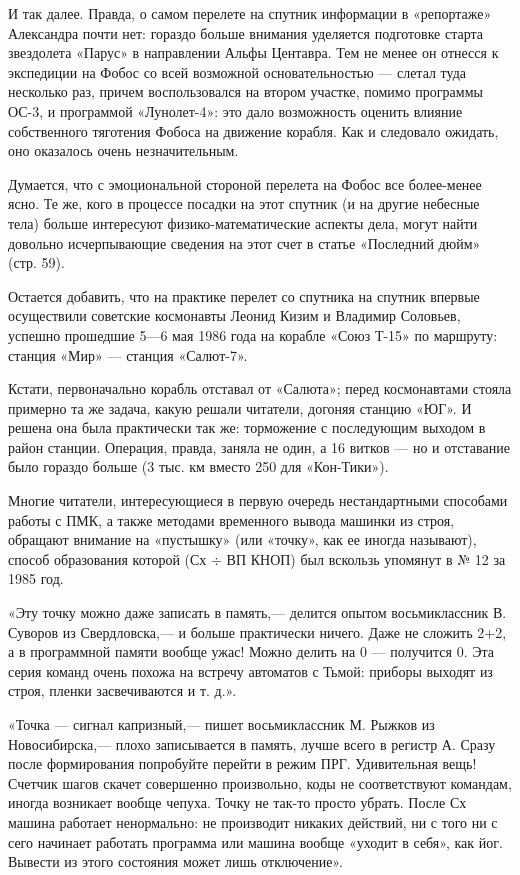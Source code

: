 \documentclass[11pt,a4paper,oneside]{article}
\begin{document}
И так далее. Правда, о самом перелете на спутник информации в «репортаже» Александра почти нет: гораздо больше внимания уделяется подготовке старта звездолета «Парус» в направлении Альфы Центавра. Тем не менее он отнесся к экспедиции на Фобос со всей возможной основательностью — слетал туда несколько раз, причем воспользовался на втором участке, помимо программы ОС-3, и программой «Лунолет-4»: это дало возможность оценить влияние собственного тяготения Фобоса на движение корабля. Как и следовало ожидать, оно оказалось очень незначительным.

Думается, что с эмоциональной стороной перелета на Фобос все более-менее ясно. Те же, кого в процессе посадки на этот спутник (и на другие небесные тела) больше интересуют физико-математические аспекты дела, могут найти довольно исчерпывающие сведения на этот счет в статье «Последний дюйм» (стр. 59).

Остается добавить, что на практике перелет со спутника на спутник впервые осуществили советские космонавты Леонид Кизим и Владимир Соловьев, успешно прошедшие 5—6 мая 1986 года на корабле «Союз Т-15» по маршруту: станция «Мир» — станция «Салют-7».

Кстати, первоначально корабль отставал от «Салюта»; перед космонавтами стояла примерно та же задача, какую решали читатели, догоняя станцию «ЮГ». И решена она была практически так же: торможение с последующим выходом в район станции. Операция, правда, заняла не один, а 16 витков — но и отставание было гораздо больше (3 тыс. км вместо 250 для «Кон-Тики»).

Многие читатели, интересующиеся в первую очередь нестандартными способами работы с ПМК, а также методами временного вывода машинки из строя, обращают внимание на «пустышку» (или «точку», как ее иногда называют), способ образования которой (Сх $\div$ ВП КНОП) был вскользь упомянут в № 12 за 1985 год.

«Эту точку можно даже записать в память,— делится опытом восьмиклассник В. Суворов из Свердловска,— и больше практически ничего. Даже не сложить 2+2, а в программной памяти вообще ужас! Можно делить на 0 — получится 0. Эта серия команд очень похожа на встречу автоматов с Тьмой: приборы выходят из строя, пленки засвечиваются и т. д.».

«Точка — сигнал капризный,— пишет восьмиклассник М. Рыжков из Новосибирска,— плохо записывается в память, лучше всего в регистр А. Сразу после формирования попробуйте перейти в режим ПРГ. Удивительная вещь! Счетчик шагов скачет совершенно произвольно, коды не соответствуют командам, иногда возникает вообще чепуха. Точку не так-то просто убрать. После Сх машина работает ненормально: не производит никаких действий, ни с того ни с сего начинает работать программа или машина вообще «уходит в себя», как йог. Вывести из этого состояния может лишь отключение».
\end{document}
